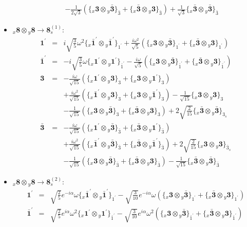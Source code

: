 \documentclass[english]{article}
\newcommand{\rep}[1]{\mathbf{#1}}
\newcommand{\repx}[2]{{}_{#2}\mathbf{#1}}
\newcommand{\subcg}[3]{\big\{ \repx{#1}{x}\otimes\repx{#2}{y}\big\}^{}_{#3}}
\begin{document}
\begin{itemize}
\begin{eqnarray*}
 & & -\frac{1}{2 \sqrt{3}}\left(\subcg{3}{\bar{3}}{\bar{3}}+\subcg{\bar{3}}{3}{\bar{3}}\right)+\frac{1}{\sqrt{3}}\subcg{\bar{3}}{\bar{3}}{\bar{3}}
\end{eqnarray*}
\item $\repx{8}{x}\otimes\repx{8}{y}\to\rep{8}_{s}^{(1)}$:
\begin{eqnarray*}
\rep{1^{\prime}} &=& i \sqrt{\frac{3}{5}} \omega ^2\subcg{\bar{1}^{\prime}}{\bar{1}^{\prime}}{1^{\prime}}+\frac{i \omega ^2}{\sqrt{5}}\left(\subcg{3}{\bar{3}}{1^{\prime}}+\subcg{\bar{3}}{3}{1^{\prime}}\right)
\\
\rep{\bar{1}^{\prime}} &=& -i \sqrt{\frac{3}{5}} \omega\subcg{1^{\prime}}{1^{\prime}}{\bar{1}^{\prime}}-\frac{i \omega }{\sqrt{5}}\left(\subcg{3}{\bar{3}}{\bar{1}^{\prime}}+\subcg{\bar{3}}{3}{\bar{1}^{\prime}}\right)
\\
\rep{3} &=& -\frac{i \omega }{\sqrt{15}}\left(\subcg{1^{\prime}}{3}{3}+\subcg{3}{1^{\prime}}{3}\right) \\ 
 & & +\frac{i \omega ^2}{\sqrt{15}}\left(\subcg{\bar{1}^{\prime}}{3}{3}+\subcg{3}{\bar{1}^{\prime}}{3}\right)-\frac{1}{\sqrt{15}}\subcg{3}{3}{3} \\ 
 & & -\frac{1}{\sqrt{15}}\left(\subcg{3}{\bar{3}}{3}+\subcg{\bar{3}}{3}{3}\right)+2 \sqrt{\frac{2}{15}}\subcg{\bar{3}}{\bar{3}}{3_{s}}
\\
\rep{\bar{3}} &=& -\frac{i \omega }{\sqrt{15}}\left(\subcg{1^{\prime}}{\bar{3}}{\bar{3}}+\subcg{\bar{3}}{1^{\prime}}{\bar{3}}\right) \\ 
 & & +\frac{i \omega ^2}{\sqrt{15}}\left(\subcg{\bar{1}^{\prime}}{\bar{3}}{\bar{3}}+\subcg{\bar{3}}{\bar{1}^{\prime}}{\bar{3}}\right)+2 \sqrt{\frac{2}{15}}\subcg{3}{3}{\bar{3}_{s}} \\ 
 & & -\frac{1}{\sqrt{15}}\left(\subcg{3}{\bar{3}}{\bar{3}}+\subcg{\bar{3}}{3}{\bar{3}}\right)-\frac{1}{\sqrt{15}}\subcg{\bar{3}}{\bar{3}}{\bar{3}}
\end{eqnarray*}
\item $\repx{8}{x}\otimes\repx{8}{y}\to\rep{8}_{s}^{(2)}$:
\begin{eqnarray*}
\rep{1^{\prime}} &=& \sqrt{\frac{2}{5}} e^{-i \alpha } \omega\subcg{\bar{1}^{\prime}}{\bar{1}^{\prime}}{1^{\prime}}-\sqrt{\frac{3}{10}} e^{-i \alpha } \omega\left(\subcg{3}{\bar{3}}{1^{\prime}}+\subcg{\bar{3}}{3}{1^{\prime}}\right)
\\
\rep{\bar{1}^{\prime}} &=& \sqrt{\frac{2}{5}} e^{i \alpha } \omega ^2\subcg{1^{\prime}}{1^{\prime}}{\bar{1}^{\prime}}-\sqrt{\frac{3}{10}} e^{i \alpha } \omega ^2\left(\subcg{3}{\bar{3}}{\bar{1}^{\prime}}+\subcg{\bar{3}}{3}{\bar{1}^{\prime}}\right)

\end{eqnarray*}
\end{itemize}
\end{document}
